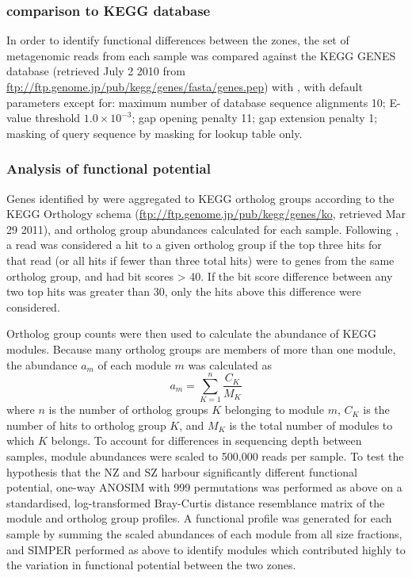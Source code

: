 \subsubsection{ comparison to \ac{KEGG} database}

In order to identify functional differences between the zones, the set of metagenomic reads from each sample was compared against the \ac{KEGG} GENES database (retrieved July 2 2010 from \url{ftp://ftp.genome.jp/pub/kegg/genes/fasta/genes.pep}) with , with default parameters except for: maximum number of database sequence alignments 10; E-value threshold $1.0\times10^{-3}$; gap opening penalty 11; gap extension penalty 1; masking of query sequence by  masking for lookup table only.

\subsubsection{Analysis of functional potential}

Genes identified by  were aggregated to \ac{KEGG} ortholog groups according to the \ac{KEGG} Orthology schema (\url{ftp://ftp.genome.jp/pub/kegg/genes/ko}, retrieved Mar 29 2011), and ortholog group abundances calculated for each sample. 
Following \citet{Coleman:2010jj}, a read was considered a hit to a given ortholog group if the top three hits for that read (or all hits if fewer than three total hits) were to genes from the same ortholog group, and had bit scores \textgreater{} 40. 
If the bit score difference between any two top hits was greater than 30, only the hits above this difference were considered.

Ortholog group counts were then used to calculate the abundance of KEGG modules.
Because many ortholog groups are members of more than one module, the abundance $a_m$ of each module $m$ was calculated as 
\[
a_{m}=\sum_{K=1}^{n}\frac{C_{K}}{M_K}
\]
where $n$ is the number of ortholog groups $K$ belonging to module $m$, $C_{K}$ is the number of hits to ortholog group $K$, and $M_{K}$ is the total number of modules to which $K$ belongs.
To account for differences in sequencing depth between samples, module abundances were scaled to 500,000 reads per sample. 
To test the hypothesis that the \ac{NZ} and \ac{SZ} harbour significantly different functional potential, one-way \ac{ANOSIM} with 999 permutations was performed as above on a standardised, log-transformed Bray-Curtis distance resemblance matrix of the module and ortholog group profiles. 
A functional profile was generated for each sample by summing the scaled abundances of each module from all size fractions, and \ac{SIMPER} performed as above to identify modules which contributed highly to the variation in functional potential between the two zones. 

